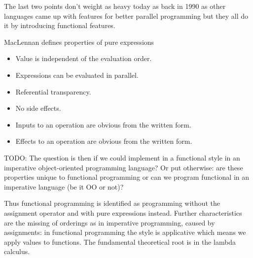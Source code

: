 The last two points don't weight as heavy today as back in 1990 as other languages came up with features for better parallel programming but they all do it by introducing functional features.

MacLennan \cite{maclennan_functional_1990} defines properties of pure expressions 
\begin{itemize}
	\item Value is independent of the evaluation order.
	\item Expressions can be evaluated in parallel.
	\item Referential transparency.
	\item No side effects.
	\item Inputs to an operation are obvious from the written form.
	\item Effects to an operation are obvious from the written form.
\end{itemize}

TODO: The question is then if we could implement in a functional style in an imperative object-oriented programming language? Or put otherwise: are these properties unique to functional programming or can we program functional in an imperative language (be it OO or not)?

Thus functional programming is identified as programming without the assignment operator and with pure expressions instead. Further characteristics are the missing of orderings as in imperative programming, caused by assignments: in functional programming the style is applicative which means we apply values to functions. The fundamental theoretical root is in the lambda calculus.